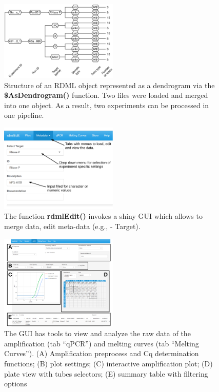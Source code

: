 \documentclass{bioinfo}
\begin{document}
\begin{figure}
\includegraphics[width=0.5\textwidth]{as_dendrogram.eps}
\caption{Structure of an RDML object represented as a dendrogram via the 
	\textbf{\$AsDendrogram()} function. Two files 
	were loaded and merged into one object. As a result, two 
	experiments can be processed in one pipeline.}\label{fig:dendrogram}
\end{figure}
\begin{figure}
	\includegraphics[width=0.5\textwidth]{figure_gui_metadata.pdf}
	\caption{The function \textbf{rdmlEdit()} invokes a shiny GUI which allows to 
		merge data, edit meta-data (e.g., - Target).}\label{fig:metadata}
\end{figure}
\begin{figure}
\includegraphics[width=0.5\textwidth]{figure_gui_curves.pdf}
\caption{The GUI has tools to view and analyze the raw data of the amplification (tab ``qPCR'') and melting curves (tab ``Melting Curves''). (A) Amplification preprocess and Cq determination functions; (B) plot settings; (C) interactive amplification plot; (D) plate view with tubes selectors; (E) summary table with filtering options}\label{fig:curves}
\end{figure}
\end{document}
